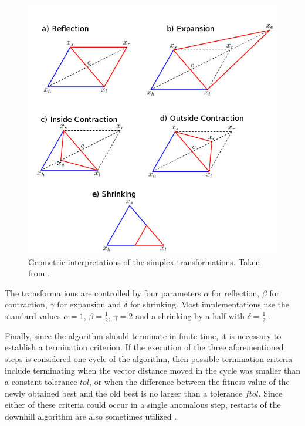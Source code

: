 \documentclass[11pt,a4paper,twoside]{report}
\begin{document}
%
\begin{figure}[H]
\begin{centering}
\includegraphics[scale=0.55]{images/amoeba}
\par\end{centering}

\caption{Geometric interpretations of the simplex transformations. Taken from
\cite{Nelder2009}.}
\label{fg:amoeba}

\end{figure}


The transformations are controlled by four parameters $\alpha$ for
reflection, $\beta$ for contraction, $\gamma$ for expansion and
$\delta$ for shrinking. Most implementations use the standard values
$\alpha=1$, $\beta=\frac{1}{2}$, $\gamma=2$ and a shrinking by
a half with $\delta=\frac{1}{2}$ \cite{Press1992,Nelder2009}. 

Finally, since the algorithm should terminate in finite time, it is
necessary to establish a termination criterion. If the execution of
the three aforementioned steps is considered one cycle of the algorithm,
then possible termination criteria include terminating when the vector
distance moved in the cycle was smaller than a constant tolerance
$tol$, or when the difference between the fitness value of the newly
obtained best and the old best is no larger than a tolerance $ftol$.
Since either of these criteria could occur in a single anomalous step,
restarts of the downhill algorithm are also sometimes utilized \cite{Press1992}. 
\end{document}
